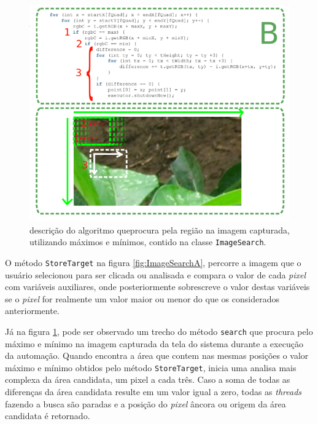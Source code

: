 \documentclass[tg]{mdtufsm}
\begin{document}
                    \begin{figure}[!htb]
                        {\centering
                        \includegraphics[width=1.0\textwidth]{imagens/codeImageB.png}
                        \caption{descrição do algoritmo queprocura pela região na imagem capturada, utilizando máximos e mínimos, contido na classe \texttt{ImageSearch}.}
                        \label{fig:ImageSearchB}}
                    \end{figure}

                    O método \texttt{StoreTarget} na figura \ref{fig:ImageSearchA}, percorre a imagem que o usuário selecionou para ser clicada ou analisada e compara o valor de cada \emph{pixel} com variáveis auxiliares, onde posteriormente sobrescreve o valor destas variáveis se o \emph{pixel} for realmente um valor maior ou menor do que os considerados anteriormente.

                    Já na figura \ref{fig:ImageSearchB}, pode ser observado um trecho do método \texttt{search} que procura pelo máximo e mínimo na imagem capturada da tela do sistema durante a execução da automação. Quando encontra a área que contem nas mesmas posições o valor máximo e mínimo obtidos pelo método \texttt{StoreTarget}, inicia uma analisa mais complexa da área candidata, um pixel a cada três. Caso a soma de todas as diferenças da área candidata resulte em um valor igual a zero, todas as \emph{threads} fazendo a busca são paradas e a posição do \emph{pixel} âncora ou origem da área candidata é retornado.
\end{document}
